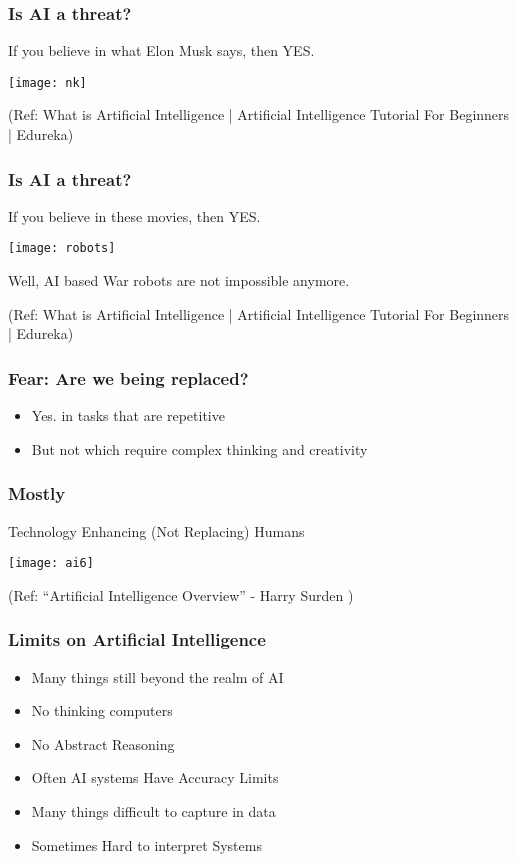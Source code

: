 \begin{frame}[fragile]\frametitle{Is AI a threat?}
If you believe in what Elon Musk says, then YES.
\begin{center}
\texttt{[image: nk]}
\end{center}
{\tiny (Ref:  What is Artificial Intelligence | Artificial Intelligence Tutorial For Beginners | Edureka)}
\end{frame}

\begin{frame}[fragile]\frametitle{Is AI a threat?}
If you believe in these movies, then YES.
\begin{center}
\texttt{[image: robots]}
\end{center}
Well, AI based War robots are not impossible anymore.

{\tiny (Ref:  What is Artificial Intelligence | Artificial Intelligence Tutorial For Beginners | Edureka)}
\end{frame}


\begin{frame}[fragile]\frametitle{Fear: Are we being replaced?}
\begin{itemize}
\item Yes. in tasks that are repetitive
\item But not which require complex thinking and creativity
\end{itemize}
\end{frame}

\begin{frame}[fragile]\frametitle{Mostly}
Technology Enhancing (Not Replacing) Humans
\begin{center}
\texttt{[image: ai6]}
\end{center}
{\tiny (Ref: ``Artificial Intelligence Overview'' - Harry Surden )}
\end{frame}

\begin{frame}[fragile]\frametitle{Limits on Artificial Intelligence}
\begin{itemize}
\item  Many things still beyond the realm of AI
\item  No thinking computers
\item  No Abstract Reasoning
\item  Often AI systems Have Accuracy Limits
\item  Many things difficult to capture in data
\item  Sometimes Hard to interpret Systems
\end{itemize}
\end{frame}

